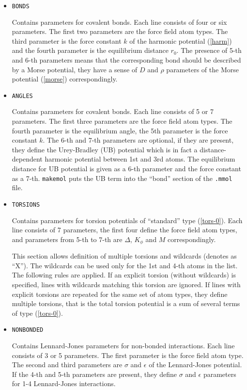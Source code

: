 \documentclass{article}
\begin{document}
\begin{itemize}

\item
\verb|BONDS|

Contains parameters for covalent bonds. Each line consists of four or six
parameters. The first two parameters are the force field atom types.
The third parameter is the force constant $k$ of the harmonic potential
(\ref{harm}) and the fourth parameter is the equilibrium
distance $r_0$. The presence of 5-th and 6-th parameters means that
the corresponding bond should be described by a Morse potential,
they have a sense of $D$ and $\rho$ parameters of the Morse potential 
(\ref{morse}) correspondingly. 

\item
\verb|ANGLES|

Contains parameters for covalent bonds. Each line consists of 5 or 7
parameters. The first three parameters are the force field atom types.
The fourth parameter is the equilibrium angle, the 5th parameter
is the force constant $k$. The 6-th and 7-th parameters are optional,
if they are present, they define the Urey-Bradley (UB) potential which
is in fact a distance-dependent harmonic potential between 1st and 3rd
atoms. The equilibrium distance for UB potential is given as a 6-th
parameter and the force constant as a 7-th. \verb|makemol| puts the 
UB term into the ``bond'' section of the \verb|.mmol| file.

\item
\verb|TORSIONS|

Contains parameters for torsion potentials of ``standard'' type (\ref{tors-0}).
Each line consists of 7 parameters, the first four define the force field
atom types, and parameters from 5-th to 7-th are $\Delta$, $K_\phi$
and $M$ correspondingly.

This section allows definition of multiple torsions and wildcards 
(denotes as ``X''). The wildcards can be used only for the 1st and 4-th
atoms in the list. The following rules are applied. If an explicit torsion   
(without wildcards) is specified, lines with wildcards matching this 
torsion are ignored. If lines with explicit torsions are repeated 
for the same set of atom types, they define multiple torsions, that 
is the total torsion potential is a sum of several terms of type 
(\ref{tors-0}).

\item
\verb|NONBONDED|

Contains Lennard-Jones parameters for non-bonded interactions.
Each line consists of 3 or 5 parameters. The first parameter is the
force field atom type. The second and third parameters are 
$\sigma$ and $\epsilon$ of the Lennard-Jones potential. If the 4-th and
5-th parameters are present, they define $\sigma$ and $\epsilon$ parameters
for 1-4 Lennard-Jones interactions.  

\end{itemize}
\end{document}
